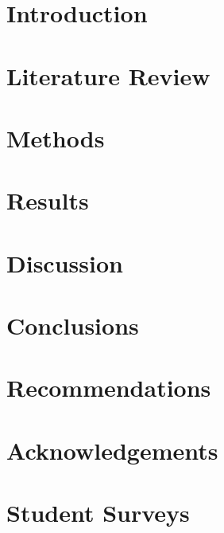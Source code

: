 \documentclass{report}
\newif\iffullsubmission
\begin{document}
    \iffullsubmission        
        \begin{singlespace}
            
            
            \tableofcontents
        \end{singlespace}

        \chapter*{Abstract}
        \addcontentsline{toc}{chapter}{Abstract}  

            
    \fi
    
    \chapter{Introduction}
        
        
    \chapter{Literature Review}
        

    \chapter{Methods}
        

    \chapter{Results}
        

    \chapter{Discussion}
        

    \chapter{Conclusions}
        

    \chapter{Recommendations}
        

    \chapter*{Acknowledgements}
        

    \printbibliography[heading=bibintoc, title={References}]

    \appendix
    \chapter{Student Surveys}\label{app:surveys}
    
\end{document}
